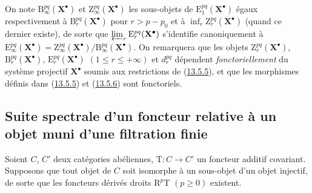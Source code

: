\begin{env}[13.5.7]
\label{0.13.5.7-fr}
On note $\mathrm B_\infty^{pq}(\mathbf X^\bullet)$ et
$\mathrm Z_\infty^{pq}(\mathbf X^\bullet)$ les sous-objets de
$\mathrm E_1^{pq}(\mathbf X^\bullet)$ égaux respectivement à
$\mathrm B_r^{pq}(\mathbf X^\bullet)$ pour $r>p-p_0$ et à
$\inf_r\mathrm Z_r^{pq}(\mathbf X^\bullet)$ (quand ce dernier existe), de
sorte que $\varprojlim_r\mathrm E_r^{pq}(\mathbf X^\bullet)$
s'identifie canoniquement à
$\mathrm E_\infty^{pq}(\mathbf X^\bullet)=
\mathrm Z_\infty^{pq}(\mathbf X^\bullet)/
\mathrm B_\infty^{pq}(\mathbf X^\bullet)$. On remarquera que les objets
$\mathrm Z_r^{pq}(\mathbf X^\bullet)$,
$\mathrm B_r^{pq}(\mathbf X^\bullet)$,
$\mathrm E_r^{pq}(\mathbf X^\bullet)$ $(1\leq r\leq+\infty)$ et
$d_r^{pq}$ dépendent \emph{fonctoriellement} du système projectif
$\mathbf X^\bullet$ soumis aux restrictions de
(\hyperref[0.13.5.5-fr]{13.5.5}), et que les morphismes définis dans
(\hyperref[0.13.5.5-fr]{13.5.5}) et
(\hyperref[0.13.5.6-fr]{13.5.6}) sont fonctoriels.
\end{env}

\subsection{Suite spectrale d'un foncteur relative à un objet muni d'une filtration finie}
\label{subsection:0.13.6-fr}

\begin{env}[13.6.1]
\label{0.13.6.1-fr}
Soient $C$, $C'$ deux catégories abéliennes, $\mathrm T:C\to C'$ un
foncteur additif covariant. Supposons que tout objet de $C$ soit isomorphe
à un sous-objet d'un objet injectif, de sorte que les foncteurs dérivés
droits $\mathrm R^p\mathrm T$ $(p\geq0)$ existent.
\end{env}

